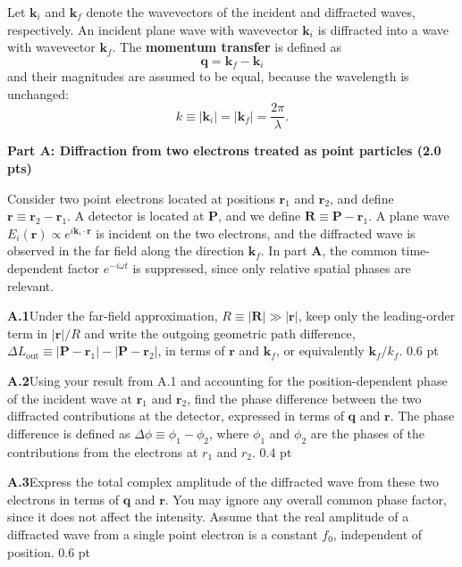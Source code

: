 Let $\mathbf{k}_i$ and $\mathbf{k}_f$ denote the wavevectors of the incident and
diffracted waves, respectively. An incident plane wave with wavevector
$\mathbf{k}_i$ is diffracted into a wave with wavevector $\mathbf{k}_f$. The
\textbf{momentum transfer} is defined as
\[
\mathbf{q} = \mathbf{k}_f - \mathbf{k}_i
\]
and their magnitudes are assumed to be equal, because the wavelength is
unchanged:
\[
k \equiv |\mathbf{k}_i| = |\mathbf{k}_f| = \frac{2\pi}{\lambda}.
\]

\textbf{Part A: Diffraction from two electrons treated as point particles (2.0 pts)}

Consider two point electrons located at positions $\mathbf{r}_1$ and
$\mathbf{r}_2$, and define $\mathbf{r} \equiv \mathbf{r}_2 - \mathbf{r}_1$. A
detector is located at $\mathbf{P}$, and we define
$\mathbf{R} \equiv \mathbf{P} - \mathbf{r}_1$. A plane wave
$E_i(\mathbf{r}) \propto e^{i\mathbf{k}_i\cdot\mathbf{r}}$ is incident on the two
electrons, and the diffracted wave is observed in the far field along the
direction $\mathbf{k}_f$. In part \textbf{A}, the common time-dependent factor
$e^{-i\omega t}$ is suppressed, since only relative spatial phases are relevant.

\textbf{A.1}\quad Under the far-field approximation,
$R \equiv |\mathbf{R}| \gg |\mathbf{r}|$, keep only the leading-order term in
$|\mathbf{r}|/R$ and write the outgoing geometric path difference,
$\Delta L_\mathrm{out} \equiv |\mathbf{P} - \mathbf{r}_1| - |\mathbf{P} - \mathbf{r}_2|$,
in terms of $\mathbf{r}$ and $\mathbf{k}_f$, or equivalently
$\mathbf{k}_f/k_f$. \hfill 0.6 pt

\textbf{A.2}\quad Using your result from A.1 and accounting for the
position-dependent phase of the incident wave at $\mathbf{r}_1$ and
$\mathbf{r}_2$, find the phase difference between the two diffracted
contributions at the detector, expressed in terms of $\mathbf{q}$ and
$\mathbf{r}$. The phase difference is defined as
$\Delta\phi \equiv \phi_1 - \phi_2$, where $\phi_1$ and $\phi_2$ are the phases
of the contributions from the electrons at $r_1$ and $r_2$. \hfill 0.4 pt

\textbf{A.3}\quad Express the total complex amplitude of the diffracted wave
from these two electrons in terms of $\mathbf{q}$ and $\mathbf{r}$. You may
ignore any overall common phase factor, since it does not affect the intensity.
Assume that the real amplitude of a diffracted wave from a single point
electron is a constant $f_0$, independent of position. \hfill 0.6 pt

